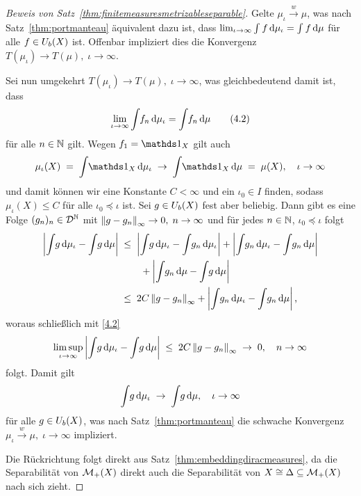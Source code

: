 \documentclass[../main/main.tex]{subfiles}
\begin{document}
\begin{proof}[Beweis von Satz~\ref{thm:finitemeasuresmetrizableseparable}]
		Gelte $\mu_\iota \xrightarrow{w} \mu$, was nach Satz~\ref{thm:portmanteau} äquivalent dazu ist, dass $\lim_{\iota \to \infty} \int_{} \, f \, \mathrm{d}\mu_\iota = \int_{} \, f \, \mathrm{d}\mu$ für alle 
		$f \in U_b(X)$ ist. Offenbar impliziert dies die Konvergenz $T(\mu_\iota) \to T(\mu), \; \iota \to \infty$.
		
		Sei nun umgekehrt $T(\mu_\iota) \to T(\mu), \; \iota \to \infty$, was gleichbedeutend damit ist, dass 
		\[ \lim_{\iota \to \infty} \int_{} \, f_n \, \mathrm{d}\mu_\iota = \int_{} \, f_n \, \mathrm{d}\mu \label{4.2} \tag{4.2} \] 
		für alle $n \in \mathbb{N}$ gilt.
		Wegen $f_1 = \indfct_X$ gilt auch
		\[ \mu_\iota(X) \; = \; \measureint{}{\indfct_X}{\mu_\iota} \; \to \; \measureint{}{\indfct_X}{\mu} \; = \; \mu(X), \quad \iota \to \infty \]
		und damit können wir eine Konstante $C < \infty$ und ein $\iota_0 \in I$ finden, sodass $\mu_\iota(X) \leq C$ für alle $\iota_0 \preceq \iota$ ist.
		Sei $g \in U_b(X)$ fest aber beliebig. Dann gibt es eine Folge $(g_n)_n \in \mathcal{D}^{\mathbb{N}}$ mit $\left\lVert g - g_n\right\rVert_\infty \to 0, \; n \to \infty$ und für jedes $n \in \mathbb{N}$, $\iota_0 \preceq \iota$ folgt
		\begin{align*}
			\left| \int_{} \, g \, \mathrm{d}\mu_\iota - \int_{} \, g \, \mathrm{d}\mu \right| \; &\leq \; 
			\left| \int_{} \, g \, \mathrm{d}\mu_\iota - \int_{} \, g_n \, \mathrm{d}\mu_\iota \right| + 
			\left| \int_{} \, g_n \, \mathrm{d}\mu_\iota - \int_{} \, g_n \, \mathrm{d}\mu \right| \\
			& \qquad + 
			\left| \int_{} \, g_n \, \mathrm{d}\mu - \int_{} \, g \, \mathrm{d}\mu \right| \\
			&\leq \; 2 C \left\lVert g - g_n\right\rVert_\infty + \left| \int_{} \, g_n \, \mathrm{d}\mu_\iota - 
			\int_{} \, g_n \, \mathrm{d}\mu \right| \text{,}
		\end{align*}
		woraus schließlich mit \eqref{4.2}
		\[ \limsup_{\iota \to \infty} \left| \int_{} \, g \, \mathrm{d}\mu_\iota - \int_{} \, g \, \mathrm{d}\mu \right| \; \leq \; 2 C \left\lVert g - g_n\right\rVert_\infty \; \to \; 0, \quad n \to \infty \]
		folgt. Damit gilt 
		\[ \int_{} \, g \, \mathrm{d}\mu_\iota \; \to \; \int_{} \, g \, \mathrm{d}\mu, \quad \iota \to \infty \]
		für alle $g \in U_b(X)$, was nach Satz~\ref{thm:portmanteau} die schwache Konvergenz $\mu_\iota \xrightarrow{w} \mu, \; \iota \to \infty$ impliziert.
		
		Die Rückrichtung folgt direkt aus Satz~\ref{thm:embeddingdiracmeasures}, da die Separabilität von $\mathcal{M}_{+}(X)$ direkt auch die Separabilität von $X \cong \Delta \subseteq \mathcal{M}_{+}(X)$ nach sich zieht.
	\end{proof}
\end{document}
